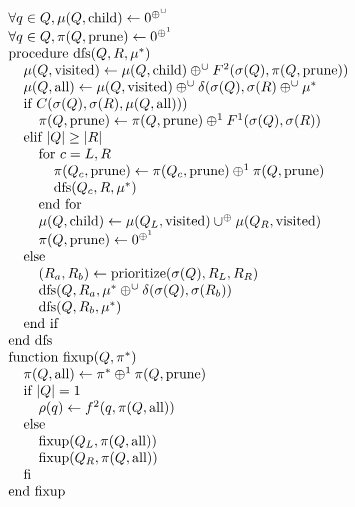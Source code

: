 \documentclass[times, 10pt,twocolumn]{article}
\newcommand{\union}{\cup}
\DeclareMathOperator{\dfs}{dfs}
\DeclareMathOperator{\child}{child}
\DeclareMathOperator{\all}{all}
\DeclareMathOperator{\visited}{visited}
\DeclareMathOperator{\prune}{prune}
\newcommand{\muv}{\union^{\oplus}}
\newcommand{\muh}{\oplus^{\union}}
\newcommand{\x}{\hspace{0.15in}}
\newcommand{\xx}{\hspace{0.3in}}
\newcommand{\xxx}{\hspace{0.45in}}
\begin{document}
\begin{equation*}
  \begin{array}{l}
    \forall q \in Q, \mu(Q, \child) \gets 0^{\muh}
    \\
    \forall q \in Q, \pi(Q, \prune) \gets 0^{\oplus^{1}}
    \\
    \mbox{procedure dfs}(Q, R, \mu^{*})
    \\
    \x \mu(Q, \visited) \gets \mu(Q, \child) \muh F^{2}(\sigma(Q), \pi(Q, \prune))
    \\
    \x \mu(Q, \all) \gets \mu(Q, \visited) \muh \delta(\sigma(Q), \sigma(R) \muh \mu^{*}
    \\
    \x \mbox{if } C(\sigma(Q), \sigma(R), \mu(Q, \all)))
    \\
    \xx \pi(Q, \prune) \gets \pi(Q, \prune) \oplus^{1} F^{1}(\sigma(Q), \sigma(R))
    \\
    \x \mbox{elif } |Q| \geq |R|
    \\
    \xx \mbox{for } c = L, R
    \\
    \xxx \pi(Q_c, \prune) \gets \pi(Q_c, \prune) \oplus^{1} \pi(Q, \prune)
    \\
    \xxx \mbox{dfs}(Q_c, R, \mu^{*})
    \\
    \xx \mbox{end for}
    \\
    \xx \mu(Q, \child) \gets \mu(Q_L, \visited) \muv \mu(Q_R, \visited)
    \\
    \xx \pi(Q, \prune) \gets 0^{\oplus^{1}}
    \\
    \x \mbox{else}
    \\
    \xx (R_a, R_b) \gets \mbox{prioritize}(\sigma(Q), R_L, R_R)
    \\
    \xx \dfs(Q, R_a, \mu^{*} \muh \delta(\sigma(Q), \sigma(R_b))
    \\
    \xx \dfs(Q, R_b, \mu^{*})
    \\
    \x \mbox{end if}
    \\
    \mbox{end dfs}
    \\
    \mbox{function fixup}(Q, \pi^{*})
    \\
    \x \pi(Q, \all) \gets \pi^{*} \oplus^{1} \pi(Q, \prune)
    \\
    \x \mbox{if } |Q| = 1
    \\
    \xx \rho(q) \gets f^{2}(q, \pi(Q, \all))
    \\
    \x \mbox{else}
    \\
    \xx \mbox{fixup}(Q_L, \pi(Q, \all))
    \\
    \xx \mbox{fixup}(Q_R, \pi(Q, \all))
    \\
    \x \mbox{fi}
    \\
    \mbox{end fixup}
  \end{array}
\end{equation*}
\end{document}
